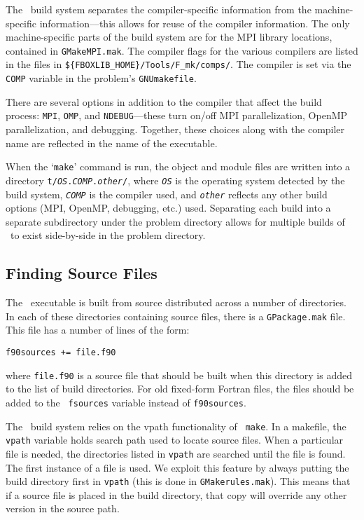 The \fboxlib\ build system separates the compiler-specific information
from the machine-specific information---this allows for reuse of the
compiler information.  The only machine-specific parts of the build system
are for the MPI library locations, contained in {\tt GMakeMPI.mak}.
The compiler flags for the various compilers are listed in the
files in {\tt \$\{FBOXLIB\_HOME\}/Tools/F\_mk/comps/}.  The compiler
is set via the {\tt COMP} variable in the problem's {\tt GNUmakefile}.

There are several options in addition to the compiler that affect the
build process: {\tt MPI}, {\tt OMP}, and {\tt NDEBUG}---these turn on/off
MPI parallelization, OpenMP parallelization, and debugging.  Together,
these choices along with the compiler name are reflected in the name
of the executable.  

When the `{\tt make}' command is run, the object and module files are
written into a directory {\tt t/{\em OS}.{\em COMP}.{\em other}/},
where {\tt \em OS} is the operating system detected by the build
system, {\tt \em COMP} is the compiler used, and {\tt \em other}
reflects any other build options (MPI, OpenMP, debugging, etc.) used.
Separating each build into a separate subdirectory under the problem
directory allows for multiple builds of \maestro\ to exist
side-by-side in the problem directory.

\subsection{Finding Source Files}

The \maestro\ executable is built from source distributed across a
number of directories.  In each of these directories containing source
files, there is a {\tt GPackage.mak} file.  This file has a number of
lines of the form:
\begin{verbatim}
f90sources += file.f90
\end{verbatim}
where {\tt file.f90} is a source file that should be built when this
directory is added to the list of build directories.  For old
fixed-form Fortran files, the files should be added to the {\tt
fsources} variable instead of {\tt f90sources}.

The \fboxlib\ build system relies on the vpath functionality of {\tt
make}.  In a makefile, the {\tt vpath} variable holds search path used
to locate source files.  When a particular file is needed, the
directories listed in {\tt vpath} are searched until the file is
found.  The first instance of a file is used.  We exploit this feature
by always putting the build directory first in {\tt vpath} (this is
done in {\tt GMakerules.mak}).  This means that if a source file is
placed in the build directory, that copy will override any other
version in the source path.

